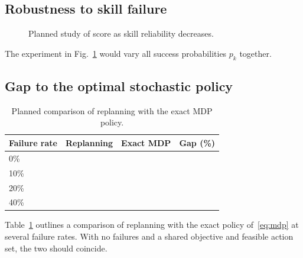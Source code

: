 \documentclass[conference]{IEEEtran}
\newcommand{\todo}[1]{}
\newcommand{\X}{}
\newcommand{\todo}[1]{\textcolor{red}{[TODO: #1]}}
\newcommand{\X}{\textcolor{red}{XX}}
\newcommand{\figph}[2]{%
  \fbox{\parbox[c][#1][c]{0.95\linewidth}{\centering\small\textcolor{red}{#2}}}}
\begin{document}
\todo{Describe Table~\ref{tab:main} once results are in.}

\subsection{Robustness to skill failure}
\begin{figure}[t]
\centering
\figph{4.2cm}{Placeholder: GPSR score vs.\ global skill failure rate
(0--40\%) for each method.}
\caption{Planned study of score as skill reliability decreases.}
\label{fig:failure}
\end{figure}

The experiment in Fig.~\ref{fig:failure} would vary all success
probabilities $p_k$ together.
\todo{Expected: travel-only interleaving degrades faster than one-by-one
because of restarts; replanning should close the gap. Confirm.}

\subsection{Gap to the optimal stochastic policy}\label{sec:gap}
\begin{table}[t]
\centering
\caption{Planned comparison of replanning with the exact MDP policy.}
\label{tab:gap}
\small
\begin{tabular}{lccc}
\toprule
Failure rate & Replanning & Exact MDP & Gap (\%) \\
\midrule
0\%  & \X & \X & \X \\
10\% & \X & \X & \X \\
20\% & \X & \X & \X \\
40\% & \X & \X & \X \\
\bottomrule
\end{tabular}
\end{table}
Table~\ref{tab:gap} outlines a comparison of replanning with the exact policy
of~\eqref{eq:mdp} at several failure rates. With no failures and a shared
objective and feasible action set, the two should coincide.
\todo{If the gap stays small, this justifies replanning on the robot.
If it grows with the failure rate, report which decisions the exact policy
makes differently, e.g.\ ordering risky perception earlier.}
\end{document}
